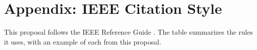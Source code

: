 %
\newcommand{\IEEEGuidePages}{4,7,8,15,16}

\clearpage
\section*{Appendix: IEEE Citation Style}

This proposal follows the IEEE Reference Guide \cite{ieeeguide}. The table summarizes the
rules it uses, with an example of each from this proposal.

